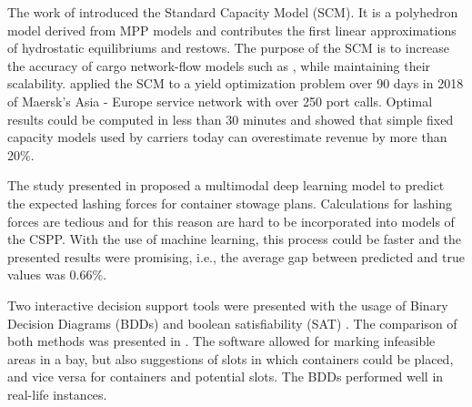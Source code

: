 \documentclass[preprint,12pt,authoryear]{elsarticle}
\begin{document}
The work of \cite{Jensen2018TheCapacity, Ajspur2019AModels, Jensen2022RevenueChallenge} introduced the Standard Capacity Model (SCM). It is a polyhedron model derived from MPP models and contributes the first linear approximations of hydrostatic equilibriums and restows. The purpose of the SCM is to increase the accuracy of cargo network-flow models such as \cite{Zurheide2015RevenueIndustry}, while maintaining their scalability. \cite{Jensen2022RevenueChallenge} applied the SCM to a yield optimization problem over 90 days in 2018 of Maersk's Asia - Europe service network with over 250 port calls. Optimal results could be computed in less than 30 minutes and showed that simple fixed capacity models used by carriers today can overestimate revenue by more than 20\%.   

The study presented in \cite{Lee2020LashingContainerships} proposed a multimodal deep learning model to predict the expected lashing forces for container stowage plans. Calculations for lashing forces are tedious and for this reason are hard to be incorporated into models of the CSPP. With the use of machine learning, this process could be faster and the presented results were promising, i.e., the average gap between predicted and true values was 0.66\%.

Two interactive decision support tools were presented with the usage of Binary Decision Diagrams (BDDs) \cite{Jensen2012FastDiagrams} and boolean satisfiability (SAT) \cite{Kroer2012SATPlanning}. The comparison of both methods was presented in \cite{Kroer2016SymbolicPlanning}. The software allowed for marking infeasible areas in a bay, but also suggestions of slots in which containers could be placed, and vice versa for containers and potential slots. The BDDs performed well in real-life instances.
\end{document}
